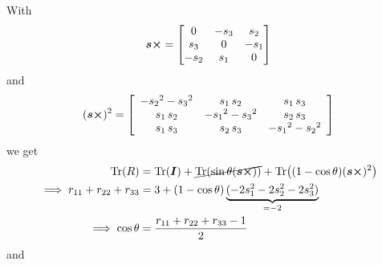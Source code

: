 \documentclass[a4paper]{scrartcl}
\begin{document}
With
\begin{equation}
    \bm{s}\cross = \begin{bmatrix}
        0 & -s_3 & s_2\\
        s_3 & 0 & -s_1\\
        -s_2 & s_1 & 0
    \end{bmatrix}
\end{equation}
and
\begin{equation}
    (\bm{s}\cross)^2 = \left[\begin{array}{ccc}  - {s_{2}}^2 - {s_{3}}^2 & s_{1}\, s_{2} & s_{1}\, s_{3}\\ s_{1}\, s_{2} &  - {s_{1}}^2 - {s_{3}}^2 & s_{2}\, s_{3}\\ s_{1}\, s_{3} & s_{2}\, s_{3} &  - {s_{1}}^2 - {s_{2}}^2 \end{array}\right]
\end{equation}
we get 
\begin{equation}
    \begin{aligned}
        \Tr(R) &= \Tr(\bm{I}) + \cancel{\Tr(\sin\theta(\bm{s}\cross))} + \Tr((1-\cos\theta)(\bm{s}\cross)^2)\\
        \implies r_{11} + r_{22} + r_{33} &= 3 +(1-\cos\theta)\underbrace{(-2s_1^2 -2s_2^2 -2s_3^2)}_{=-2}\\
        \implies \cos\theta &= \frac{r_{11} + r_{22} + r_{33} -1}{2}
    \end{aligned}
\end{equation}
and
\end{document}
